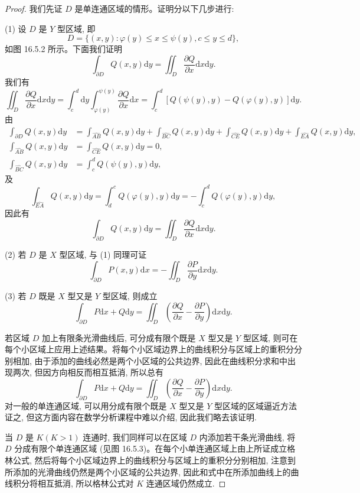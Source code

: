 \begin{proof}
我们先证 $D$ 是单连通区域的情形。证明分以下几步进行:

(1) 设 $D$ 是 $Y$ 型区域, 即
\[
  D=\{(x,y):\varphi(y)\leqslant x\leqslant\psi(y),c\leqslant y\leqslant d\},
\]
如图 16.5.2 所示。下面我们证明
\[
  \int_{\partial D}Q(x,y)\mathrm dy=\iint_D\frac{\partial Q}{\partial x}\mathrm dx\mathrm dy.
\]
我们有
\[
  \iint_D\frac{\partial Q}{\partial x}\mathrm dx\mathrm dy
  =\int_c^d\mathrm dy\int_{\varphi(y)}^{\psi(y)}
  \frac{\partial Q}{\partial x}\mathrm dx
  =\int_c^d[Q(\psi(y),y)-Q(\varphi(y),y)]\mathrm dy.
\]
由
\[
\begin{aligned}
  \int_{\partial D}Q(x,y)\mathrm dy
  &=\int_{\widehat{AB}}Q(x,y)\mathrm dy+\int_{\widehat{BC}}Q(x,y)\mathrm dy
    +\int_{\widehat{CE}}Q(x,y)\mathrm dy+\int_{\widehat{EA}}Q(x,y)\mathrm dy,\\
  \int_{\widehat{AB}}Q(x,y)\mathrm dy&=\int_{\widehat{CE}}Q(x,y)\mathrm dy=0,\\
  \int_{\widehat{BC}}Q(x,y)\mathrm dy&=\int_c^d Q(\psi(y),y)\mathrm dy,
\end{aligned}
\]
及
\[
  \int_{\widehat{EA}}Q(x,y)\mathrm dy
  =\int_d^cQ(\varphi(y),y)\mathrm dy
  =-\int_c^dQ(\varphi(y),y)\mathrm dy,
\]
因此有
\[
  \int_{\partial D}Q(x,y)\mathrm dy=\iint_D\frac{\partial Q}{\partial x}\mathrm dx\mathrm dy.
\]

(2) 若 $D$ 是 $X$ 型区域, 与 (1) 同理可证
\[
  \int_{\partial D}P(x,y)\mathrm dx=-\iint_D\frac{\partial P}{\partial y}\mathrm dx\mathrm dy.
\]

(3) 若 $D$ 既是 $X$ 型又是 $Y$ 型区域, 则成立
\[
  \int_{\partial D}P\mathrm dx+Q\mathrm dy
  =\iint_D\left(\frac{\partial Q}{\partial x}-\frac{\partial P}{\partial y}\right)\mathrm dx\mathrm dy.
\]

若区域 $D$ 加上有限条光滑曲线后, 可分成有限个既是 $X$ 型又是 $Y$ 型区域, 则可在每个小区域上应用上述结果。将每个小区域边界上的曲线积分与区域上的重积分分别相加, 由于添加的曲线必然是两个小区域的公共边界, 因此在曲线积分求和中出现两次, 但因方向相反而相互抵消, 所以总有
\[
  \int_{\partial D}P\mathrm dx+Q\mathrm dy
  =\iint_D\left(\frac{\partial Q}{\partial x}-\frac{\partial P}{\partial y}\right)\mathrm dx\mathrm dy.
\]
对一般的单连通区域, 可以用分成有限个既是 $X$ 型又是 $Y$ 型区域的区域逼近方法证之, 但这方面内容在数学分析课程中难以介绍, 因此我们略去该证明.

当 $D$ 是 $K(K>1)$ 连通时, 我们同样可以在区域 $D$ 内添加若干条光滑曲线, 将 $D$ 分成有限个单连通区域 (见图 16.5.3)。在每个小单连通区域上由上所证成立格林公式, 然后将每个小区域边界上的曲线积分与区域上的重积分分别相加, 注意到所添加的光滑曲线仍然是两个小区域的公共边界, 因此和式中在所添加曲线上的曲线积分将相互抵消, 所以格林公式对 $K$ 连通区域仍然成立.
\end{proof}


